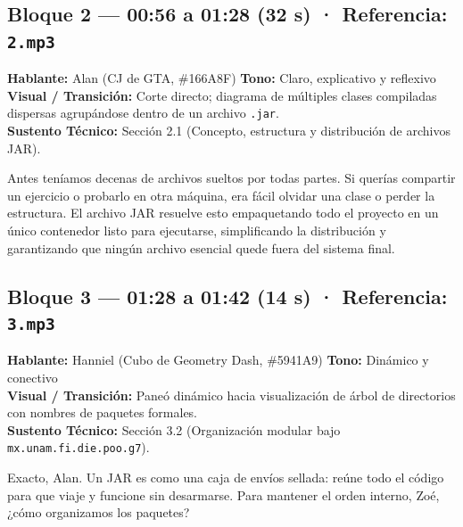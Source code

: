 \documentclass[letterpaper,11pt]{article}
\begin{document}
\subsection*{Bloque 2 — 00:56 a 01:28 (32 s) · Referencia: \texttt{2.mp3}}
\textbf{Hablante:} Alan \textcolor{colorAlan}{(CJ de GTA, \#166A8F)} \hfill \textbf{Tono:} Claro, explicativo y reflexivo\\
\textbf{Visual / Transición:} Corte directo; diagrama de múltiples clases compiladas dispersas agrupándose dentro de un archivo \texttt{.jar}.\\
\textbf{Sustento Técnico:} Sección 2.1 (Concepto, estructura y distribución de archivos JAR).
\begin{tcolorbox}[colback=colorAlan!5,colframe=colorAlan,title=\textbf{Locución Definitiva — Alan}]
Antes teníamos decenas de archivos sueltos por todas partes. Si querías compartir un ejercicio o probarlo en otra máquina, era fácil olvidar una clase o perder la estructura. El archivo JAR resuelve esto empaquetando todo el proyecto en un único contenedor listo para ejecutarse, simplificando la distribución y garantizando que ningún archivo esencial quede fuera del sistema final.
\end{tcolorbox}

\subsection*{Bloque 3 — 01:28 a 01:42 (14 s) · Referencia: \texttt{3.mp3}}
\textbf{Hablante:} Hanniel \textcolor{colorHanniel}{(Cubo de Geometry Dash, \#5941A9)} \hfill \textbf{Tono:} Dinámico y conectivo\\
\textbf{Visual / Transición:} Paneó dinámico hacia visualización de árbol de directorios con nombres de paquetes formales.\\
\textbf{Sustento Técnico:} Sección 3.2 (Organización modular bajo \texttt{mx.unam.fi.die.poo.g7}).
\begin{tcolorbox}[colback=colorHanniel!5,colframe=colorHanniel,title=\textbf{Locución Definitiva — Hanniel}]
Exacto, Alan. Un JAR es como una caja de envíos sellada: reúne todo el código para que viaje y funcione sin desarmarse. Para mantener el orden interno, Zoé, ¿cómo organizamos los paquetes?
\end{tcolorbox}
\end{document}
